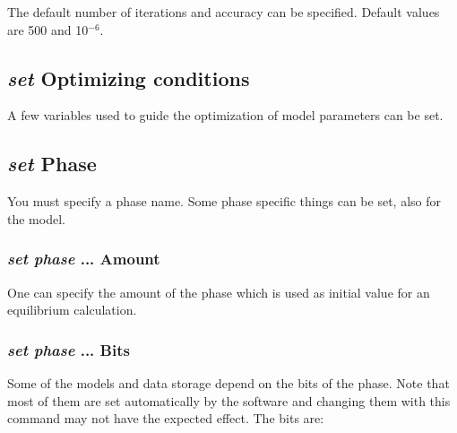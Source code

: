 \documentclass[12pt]{article}
\begin{document}
The default number of iterations and accuracy can be specified.
Default values are 500 and 10$^{-6}$.

\subsection{{\em set} Optimizing conditions}

A few variables used to guide the optimization of model parameters can
be set.

\subsection{{\em set} Phase}

You must specify a phase name.  Some phase specific things can be set,
also for the model.

\subsubsection{{\em set phase} ... Amount}

One can specify the amount of the phase which is used as initial value
for an equilibrium calculation.

\subsubsection{{\em set phase} ... Bits}

Some of the models and data storage depend on the bits of the phase.
Note that most of them are set automatically by the software and
changing them with this command may not have the expected effect.  The
bits are:
\end{document}
